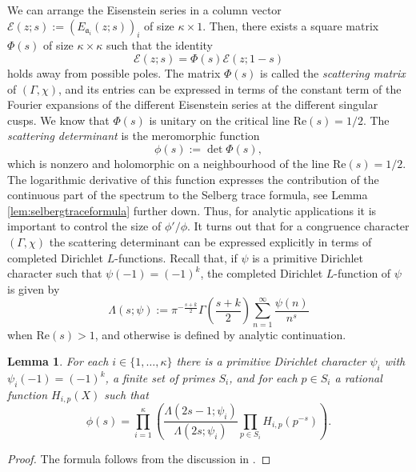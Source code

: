 \documentclass{article}
\newtheorem{lem}[thm]{Lemma}
\theoremstyle{named}
\newcommand{\E}{\mathcal{E}}
\renewcommand{\a}{\mathfrak{a}}
\begin{document}
We can arrange the Eisenstein series in a column vector $\E(z; s) := (E_{\a_i}(z; s))_i$ of size $\kappa\times 1$. Then, there exists a square matrix $\Phi(s)$ of size $\kappa \times \kappa$ such that the identity
\begin{equation}\label{eq:scatteringmatrixfunctionalequation}
    \E(z;s) = \Phi(s)\E(z; 1-s)
\end{equation}
holds away from possible poles. The matrix $\Phi(s)$ is called the \emph{scattering matrix} of $(\Gamma, \chi)$, and its entries can be expressed in terms of the constant term of the Fourier expansions of the different Eisenstein series at the different singular cusps. We know that $\Phi(s)$ is unitary on the critical line $\text{Re}(s) = 1/2$. The \emph{scattering determinant} is the meromorphic function
\begin{equation}\label{eq:scatteringdeterminant}
    \phi(s) := \det \Phi(s),
\end{equation}
which is nonzero and holomorphic on a neighbourhood of the line $\text{Re}(s) = 1/2$. The logarithmic derivative of this function expresses the contribution of the continuous part of the spectrum to the Selberg trace formula, see Lemma \ref{lem:selbergtraceformula} further down. Thus, for analytic applications it is important to control the size of $\phi'/\phi$. It turns out that for a congruence character $(\Gamma, \chi)$ the scattering determinant can be expressed explicitly in terms of completed Dirichlet $L$-functions. Recall that, if $\psi$ is a primitive Dirichlet character such that $\psi(-1) = (-1)^k$, the completed Dirichlet $L$-function of $\psi$ is given by   
\begin{equation*}
    \Lambda(s; \psi) := \pi^{-\frac{s + k}{2}}\Gamma\left(\frac{s + k}{2}\right)\sum_{n = 1}^\infty \frac{\psi(n)}{n^s}
\end{equation*}
when $\text{Re}(s) > 1$, and otherwise is defined by analytic continuation. 
\begin{lem}\label{lem:basicformscattering}
For each $i \in \{1, \ldots, \kappa\}$ there is a primitive Dirichlet character $\psi_i$ with $\psi_i(-1) = (-1)^k$, a finite set of primes $S_i$, and for each $p \in S_i$ a rational function $H_{i, p}(X)$ such that 
\begin{equation*}
    \phi(s) = \prod_{i = 1}^\kappa\left(\frac{\Lambda(2s-1; \psi_i)}{\Lambda(2s; \psi_i)} \prod_{p \in S_i} H_{i, p}(p^{-s})\right).
\end{equation*}
\end{lem}
\begin{proof}
The formula follows from the discussion in \cite[Paragraph 2.7]{reznikoveisensteinmatrix}.
\end{proof}
\end{document}
